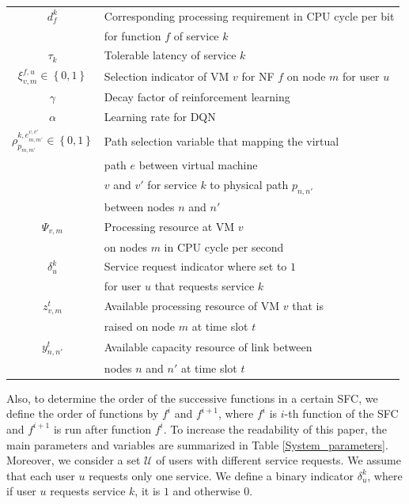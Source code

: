 \documentclass[20pt,twocolumn]{IEEEtran}
\begin{document}
\begin{table}[h!]
{\begin{tabular}{|c|l| }
			$d_{f}^{k}$&Corresponding processing requirement in CPU cycle per bit \\& for function $f$ of service $k$\\\hline
			$\tau_k$ & Tolerable latency of service  $k$\\\hline
			$\xi_{v,m}^{f,u} \in \left\lbrace0,1 \right\rbrace $& Selection indicator of VM $v$ for NF $f$ on node $m$ for user $u$\\\hline
			$\gamma$&Decay factor of reinforcement learning\\\hline
			$\alpha$&Learning rate for DQN \\\hline
			$\rho^{k,e^{v,v'}_{m,m'}}_{{p}_{m,m'}}\in \left\lbrace0,1 \right\rbrace $& Path selection variable that mapping  the virtual\\& path $e$ between virtual machine\\& $v$ and $v'$ for service $k$  to physical path $p_{n,n'}$\\& between nodes $n$ and $n'$\\\hline
			$\Psi_{v,m}$&Processing resource at VM $v$ \\& on nodes $m$ in CPU cycle per second\\\hline 
			$\delta_{u}^k$& Service request indicator where set to $1$  \\&for user $u$ that requests service $k$  \\\hline
			${z}_{v,m}^{t}$& Available processing resource of VM $v$ that is \\&raised on node $m$ at time slot $t$\\\hline
			${y}_{{n,n'}}^{t}$&Available capacity resource of link between \\& nodes $n$ and $n'$ at time slot $t$\\\hline
		\end{tabular}
	}
	\end{table}
Also, to determine the order of the successive functions in  a certain SFC, we define the order  of   functions by $f^{i}$ and $f^{i+1}$, where $f^{i}$ is  $i$-th function of the SFC and  $f^{i+1}$ is run after function $f^{i}$. To increase the readability of this paper, the main parameters and variables are summarized in Table \ref{System_parameters}.
Moreover, we consider a set $\mathcal{U}$ of users with different service requests. We assume that each user $u$  requests only one service. We define a binary indicator  $\delta_{u}^{k}$, where if user $u$ requests service $k$, it is $1$ and otherwise  $0$. 
\end{document}
